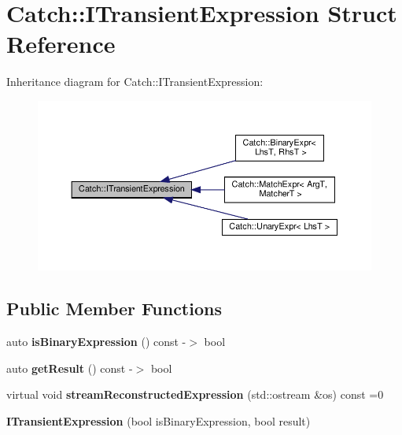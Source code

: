 \hypertarget{structCatch_1_1ITransientExpression}{}\section{Catch\+:\+:I\+Transient\+Expression Struct Reference}
\label{structCatch_1_1ITransientExpression}


Inheritance diagram for Catch\+:\+:I\+Transient\+Expression\+:
\nopagebreak
\begin{figure}[H]
\begin{center}
\leavevmode
\includegraphics[width=350pt]{structCatch_1_1ITransientExpression__inherit__graph}
\end{center}
\end{figure}
\subsection*{Public Member Functions}
\begin{DoxyCompactItemize}
\item 
\mbox{\label{structCatch_1_1ITransientExpression_a3b436e13a0a6d3522bbf70d4e31deb22}} 
auto {\bfseries is\+Binary\+Expression} () const -\/$>$ bool
\item 
\mbox{\label{structCatch_1_1ITransientExpression_a101c7db86c87eff93a8ff496720e6320}} 
auto {\bfseries get\+Result} () const -\/$>$ bool
\item 
\mbox{\label{structCatch_1_1ITransientExpression_aabe1889df9c6e639a24afb08d8a0fe9e}} 
virtual void {\bfseries stream\+Reconstructed\+Expression} (std\+::ostream \&os) const =0
\item 
\mbox{\label{structCatch_1_1ITransientExpression_aafe69572b7ed884e63ec81f58d4afd8c}} 
{\bfseries I\+Transient\+Expression} (bool is\+Binary\+Expression, bool result)
\end{DoxyCompactItemize}
